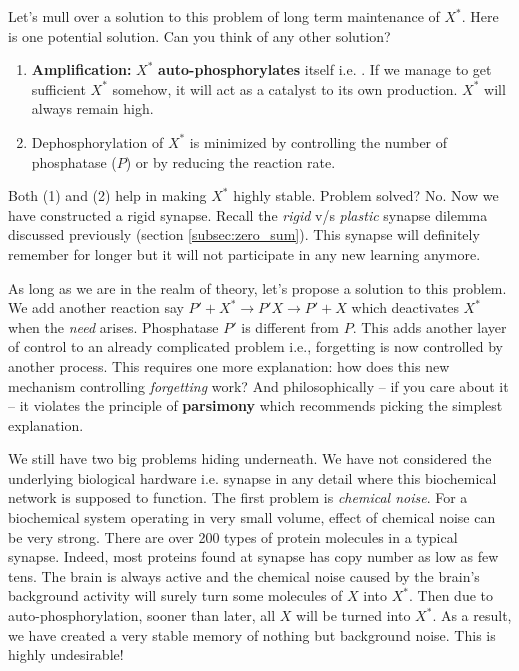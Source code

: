 \documentclass[]{resonance}
\begin{document}
Let's mull over a solution to this problem of long term maintenance of $X^*$.
Here is one potential solution. Can you think of any other solution?

\begin{enumerate}
    \item \textbf{Amplification:} $X^*$ \textbf{auto-phosphorylates} itself i.e. . If we manage to get sufficient $X^*$ somehow, it
        will act as a catalyst to its own production. $X^*$ will always remain
        high.
    \item Dephosphorylation of $X^*$ is minimized by controlling the number of
        phosphatase ($P$) or by reducing the reaction rate.
\end{enumerate} 

Both (1) and (2) help in making $X^*$ highly stable. Problem solved? No.  Now
we have constructed a rigid synapse. Recall the \textit{rigid} v/s
\textit{plastic} synapse dilemma discussed previously (section
\ref{subsec:zero_sum}). This synapse will definitely remember for longer
but it will not participate in any new learning anymore.

As long as we are in the realm of theory, let's propose a solution to this
problem. We add another reaction say $P'+X^*\rightarrow P'X \rightarrow P'+X$
which deactivates $X^*$ when the \textit{need} arises. Phosphatase $P'$ is
different from $P$. This adds another layer of control to an already complicated
problem i.e., forgetting is now controlled by another process. This requires one
more explanation: how does this new mechanism controlling \textit{forgetting}
work?  And philosophically -- if you care about it -- it violates the principle
of \textbf{parsimony} which recommends picking the simplest explanation.

We still have two big problems hiding underneath. We have not considered the
underlying biological hardware i.e. synapse in any detail where this biochemical
network is supposed to function. The first problem is \emph{chemical noise}. For
a biochemical system operating in very small volume, effect of chemical noise
can be very strong.  There are over 200 types of protein molecules in
a typical synapse. Indeed, most proteins found at synapse has copy number as low
as few tens. The brain is always active and the chemical noise caused by the
brain's background activity will surely turn some molecules of $X$ into $X^*$.
Then due to auto-phosphorylation, sooner than later, all $X$ will be turned into
$X^*$. As a result, we have created a very stable memory of nothing but
background noise.  This is highly undesirable!
\end{document}
